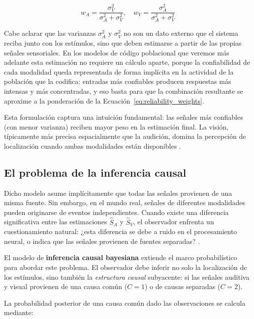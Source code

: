 \begin{equation}
w_A = \frac{\sigma_V^2}{\sigma_A^2 + \sigma_V^2}, \quad w_V = \frac{\sigma_A^2}{\sigma_A^2 + \sigma_V^2}
\label{eq:reliability_weights}
\end{equation}

Cabe aclarar que las varianzas $\sigma_A^2$ y $\sigma_V^2$ no son un dato externo que el sistema reciba junto con los estímulos, sino que deben estimarse a partir de las propias señales sensoriales. En los modelos de código poblacional que veremos más adelante esta estimación no requiere un cálculo aparte, porque la confiabilidad de cada modalidad queda representada de forma implícita en la actividad de la población que la codifica: entradas más confiables producen respuestas más intensas y más concentradas, y eso basta para que la combinación resultante se aproxime a la ponderación de la Ecuación~\ref{eq:reliability_weights}.

Esta formulación captura una intuición fundamental: las señales más confiables (con menor varianza) reciben mayor peso en la estimación final. La visión, típicamente más precisa espacialmente que la audición, domina la percepción de localización cuando ambas modalidades están disponibles \citep{paredes2025scikit}.

\subsection{El problema de la inferencia causal}
\label{subsec:inferencia_causal}

Dicho modelo asume implícitamente que todas las señales provienen de una misma fuente. Sin embargo, en el mundo real, señales de diferentes modalidades pueden originarse de eventos independientes. Cuando existe una diferencia significativa entre las estimaciones $\hat{S}_A$ y $\hat{S}_V$, el observador enfrenta un cuestionamiento natural: ¿esta diferencia se debe a ruido en el procesamiento neural, o indica que las señales provienen de fuentes separadas? \citep{paredes2025scikit}.

El modelo de \textbf{inferencia causal bayesiana} \citep{kording2007causal} extiende el marco probabilístico para abordar este problema. El observador debe inferir no solo la localización de los estímulos, sino también la \textit{estructura causal} subyacente: si las señales auditiva y visual provienen de una causa común ($C=1$) o de causas separadas ($C=2$).

La probabilidad posterior de una causa común dado las observaciones se calcula mediante:

